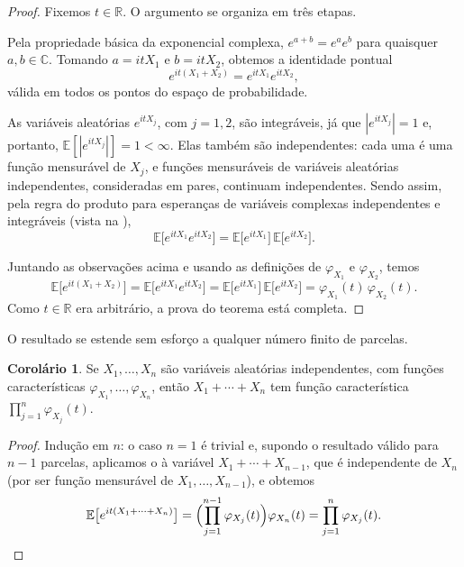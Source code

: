 \documentclass[12pt,portuguese]{article}
\theoremstyle{definition}
\newtheorem{corollary}[corollary]{Corolário}
\theoremstyle{plainexercise}
\theoremstyle{starredexercise}
\theoremstyle{definition}
\begin{document}
\begin{proof}
Fixemos $t \in \mathbb{R}$. O argumento se organiza em três etapas.

\smallskip

Pela propriedade básica da exponencial
complexa, $e^{a+b} = e^{a}e^{b}$ para quaisquer $a,b \in \mathbb{C}$. Tomando
$a = itX_1$ e $b = itX_2$, obtemos a identidade pontual
\[
e^{it(X_1+X_2)} = e^{itX_1}e^{itX_2},
\]
válida em todos os pontos do espaço de probabilidade.

\smallskip

As variáveis aleatórias $e^{itX_j}$, com $j=1,2$, são integráveis, já que $|e^{itX_j}| = 1$ e, portanto,
$\mathbb{E}[|e^{itX_j}|] = 1 < \infty$. Elas também são
independentes: cada uma é uma função mensurável de $X_j$, e funções mensuráveis
de variáveis aleatórias independentes, consideradas em pares, continuam
independentes. Sendo assim, pela regra do produto para esperanças de variáveis
complexas independentes e integráveis (vista na ),
\[
\mathbb{E}\big[e^{itX_1}e^{itX_2}\big]
= \mathbb{E}\big[e^{itX_1}\big]\,\mathbb{E}\big[e^{itX_2}\big].
\]

\smallskip

Juntando as observações acima e usando as definições de $\varphi_{X_1}$ e $\varphi_{X_2}$,
temos
\[
\mathbb{E}\big[e^{it(X_1+X_2)}\big]
= \mathbb{E}\big[e^{itX_1}e^{itX_2}\big]
= \mathbb{E}\big[e^{itX_1}\big]\,\mathbb{E}\big[e^{itX_2}\big]
= \varphi_{X_1}(t)\,\varphi_{X_2}(t).
\]
Como $t \in \mathbb{R}$ era arbitrário, a prova do teorema está completa.
\end{proof}

O resultado se estende sem esforço a qualquer número finito de parcelas.

\begin{corollary}\label{cor:fc-soma-n}
Se $X_1,\dots,X_n$ são variáveis aleatórias independentes, com funções
características $\varphi_{X_1},\dots,\varphi_{X_n}$, então $X_1+\cdots+X_n$ tem função
característica $\prod_{j=1}^{n}\varphi_{X_j}(t)$.
\end{corollary}

\begin{proof}
Indução em $n$: o caso $n = 1$ é trivial e, supondo o resultado válido para
$n-1$ parcelas, aplicamos o  à variável
$X_1+\cdots+X_{n-1}$, que é independente de $X_n$ (por ser função mensurável de
$X_1,\dots,X_{n-1}$), e obtemos
\[
\mathbb{E}\big[e^{it(X_1+\cdots+X_n)}\big]
= \Bigl(\prod_{j=1}^{n-1}\varphi_{X_j}(t)\Bigr)\varphi_{X_n}(t)
= \prod_{j=1}^{n}\varphi_{X_j}(t).
\]
\end{proof}
\end{document}
